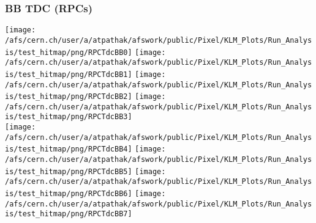 \documentclass{beamer}
\begin{document}
\begin{frame}
\frametitle{BB TDC (RPCs)}
\vspace*{.05cm}
\begin{center}
\begin{normalsize}

\vspace*{-.2cm}
\begin{center}

  \texttt{[image: /afs/cern.ch/user/a/atpathak/afswork/public/Pixel/KLM\_Plots/Run\_Analysis/test\_hitmap/png/RPCTdcBB0]}
  \texttt{[image: /afs/cern.ch/user/a/atpathak/afswork/public/Pixel/KLM\_Plots/Run\_Analysis/test\_hitmap/png/RPCTdcBB1]}
  \texttt{[image: /afs/cern.ch/user/a/atpathak/afswork/public/Pixel/KLM\_Plots/Run\_Analysis/test\_hitmap/png/RPCTdcBB2]}
  \texttt{[image: /afs/cern.ch/user/a/atpathak/afswork/public/Pixel/KLM\_Plots/Run\_Analysis/test\_hitmap/png/RPCTdcBB3]} \\
  \texttt{[image: /afs/cern.ch/user/a/atpathak/afswork/public/Pixel/KLM\_Plots/Run\_Analysis/test\_hitmap/png/RPCTdcBB4]}
  \texttt{[image: /afs/cern.ch/user/a/atpathak/afswork/public/Pixel/KLM\_Plots/Run\_Analysis/test\_hitmap/png/RPCTdcBB5]}
  \texttt{[image: /afs/cern.ch/user/a/atpathak/afswork/public/Pixel/KLM\_Plots/Run\_Analysis/test\_hitmap/png/RPCTdcBB6]}
  \texttt{[image: /afs/cern.ch/user/a/atpathak/afswork/public/Pixel/KLM\_Plots/Run\_Analysis/test\_hitmap/png/RPCTdcBB7]}


\end{center}
\end{normalsize}
\end{center}
\end{frame}
\end{document}
